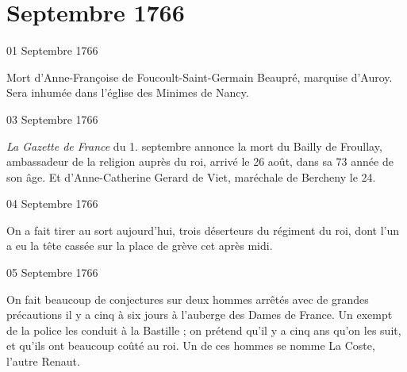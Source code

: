                   \chapter*{Septembre 1766}



                     \begin{diary}{01 Septembre 1766}{}

                         Mort d’Anne-Françoise de Foucoult-Saint-Germain
                              Beaupré, marquise d’Auroy. Sera inhumée
                           dans l’église des Minimes de
                              Nancy. \bigskip


                     \end{diary}

                     \begin{diary}{03 Septembre 1766}{}


                           \emph{La Gazette de France} du 1. septembre annonce
                           la mort du Bailly de
                              Froullay, ambassadeur de la
                           religion auprès du roi,
                           arrivé le 26 août, dans
                           sa 73 année de son âge. Et d’Anne-Catherine
                              Gerard de Viet, maréchale de Bercheny
                           le 24. \bigskip


                     \end{diary}

                     \begin{diary}{04 Septembre 1766}{}

                         On a fait tirer au sort aujourd'hui,
                           trois
                           déserteurs du régiment du roi, dont l’un a eu
                           la tête cassée sur la place de grève cet après
                           midi. \bigskip


                     \end{diary}

                     \begin{diary}{05 Septembre 1766}{}

                         On fait beaucoup de conjectures sur
                           deux
                           hommes arrêtés avec de grandes précautions
                           il y a cinq à six jours à l’auberge des
                              Dames de France. Un exempt de la police
                           les conduit à la Bastille ;
                           on prétend qu’il
                           y a cinq ans qu’on les suit, et qu’ils ont
                           beaucoup coûté au roi. Un de
                           ces
                           hommes se nomme La Coste,
                           l’autre Renaut. \bigskip


                     \end{diary}

